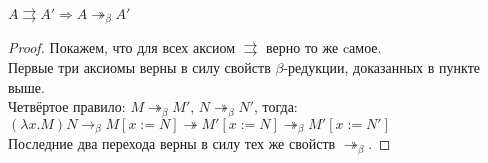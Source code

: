 \begin{lemma}
$A \rightrightarrows A' \Rightarrow A \twoheadrightarrow_\beta A'$
\end{lemma}
\begin{proof}
Покажем, что для всех аксиом $\rightrightarrows$ верно то же cамое. \\
Первые три аксиомы верны в силу свойств $\beta$-редукции, доказанных в пункте
выше. \\
Четвёртое правило: $M \twoheadrightarrow_\beta M'$, $N \twoheadrightarrow_\beta
N'$, тогда: \\
$(\lambda x . M) N \to_\beta M[x:=N] \twoheadrightarrow M'[x:=N]
\twoheadrightarrow_\beta M'[x:=N']$ \\
Последние два перехода верны в силу тех же свойств $\twoheadrightarrow_\beta$. 
\end{proof}
